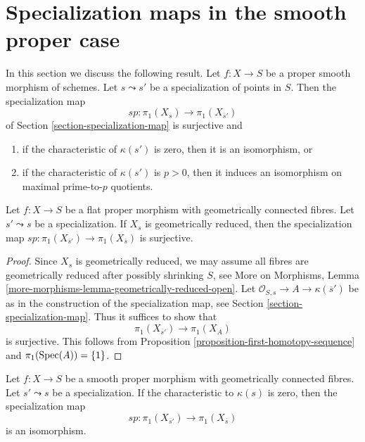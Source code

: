 \section{Specialization maps in the smooth proper case}
\label{section-specialization-smooth-proper}

\noindent
In this section we discuss the following result.
Let $f : X \to S$ be a proper smooth morphism of schemes.
Let $s \leadsto s'$ be a specialization of points in $S$.
Then the specialization map
$$
sp : \pi_1(X_{\overline{s}}) \longrightarrow \pi_1(X_{\overline{s}'})
$$
of Section \ref{section-specialization-map}
is surjective and
\begin{enumerate}
\item if the characteristic of $\kappa(s')$ is zero, then it is
an isomorphism, or
\item if the characteristic of $\kappa(s')$ is $p > 0$, then it
induces an isomorphism on maximal prime-to-$p$ quotients.
\end{enumerate}

\begin{lemma}
\label{lemma-specialization-map-surjective}
Let $f : X \to S$ be a flat proper morphism with geometrically
connected fibres. Let $s' \leadsto s$ be a specialization.
If $X_s$ is geometrically reduced, then the specialization
map $sp : \pi_1(X_{\overline{s}'}) \to \pi_1(X_{\overline{s}})$
is surjective.
\end{lemma}

\begin{proof}
Since $X_s$ is geometrically reduced, we may assume all
fibres are geometrically reduced after possibly shrinking $S$, see
More on Morphisms, Lemma \ref{more-morphisms-lemma-geometrically-reduced-open}.
Let $\mathcal{O}_{S, s} \to A \to \kappa(\overline{s}')$ be as
in the construction of the specialization map, see
Section \ref{section-specialization-map}.
Thus it suffices to show that
$$
\pi_1(X_{\overline{s}'}) \to \pi_1(X_A)
$$
is surjective. This follows from
Proposition \ref{proposition-first-homotopy-sequence}
and $\pi_1(\mathop{\mathrm{Spec}}(A)) = \{1\}$.
\end{proof}

\begin{proposition}
\label{proposition-specialization-map-isomorphism}
Let $f : X \to S$ be a smooth proper morphism with geometrically
connected fibres. Let $s' \leadsto s$ be a specialization.
If the characteristic to $\kappa(s)$ is zero, then the specialization
map
$$
sp : \pi_1(X_{\overline{s}'}) \to \pi_1(X_{\overline{s}})
$$
is an isomorphism.
\end{proposition}

